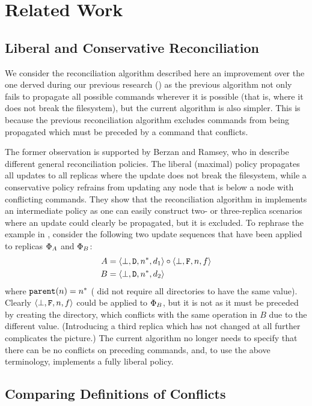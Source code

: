 
\section{Related Work}

\subsection{Liberal and Conservative Reconciliation}

We consider the reconciliation algorithm described here an improvement over
the one derved during our previous research (\cite{NREC})
as the previous algorithm not only fails to propagate all possible commands
wherever it is possible (that is, where it does not break the filesystem),
but the current algorithm is also simpler.
This is because the previous reconciliation algorithm excludes
commands from being propagated which must be preceded by a command that conflicts.

The former observation is supported by Berzan and Ramsey, who in \cite{CBNR} 
describe different general reconciliation policies.
The liberal (maximal) policy propagates all updates to all replicas where
the update does not break the filesystem, while a conservative policy
refrains from updating any node that is below a node with conflicting commands.
They show that the reconciliation algorithm in \cite{NREC} implements
an intermediate policy as one can easily construct two- or three-replica scenarios
where an update could clearly be propagated, but it is excluded.
To rephrase the example in \cite{CBNR}, consider the following two
update sequences that have been applied to replicas $\Phi_A$ and $\Phi_B$:
\begin{align*}
A&=\langle{\bot,\mathtt{D},n^*,d_1}\rangle\circ\langle{\bot,\mathtt{F},n,f}\rangle \\
B&=\langle{\bot,\mathtt{D},n^*,d_2}\rangle
\end{align*}
where $\mathtt{parent}(n)=n^*$ (\cite{NREC} did not require all directories to have the same value).
Clearly $\langle{\bot,\mathtt{F},n,f}\rangle$ could be applied to $\Phi_B$, but it is not as
it must be preceded by creating the directory, which conflicts with the same operation in $B$
due to the different value.
(Introducing a third replica which has not changed at all further complicates the picture.)
The current algorithm no longer needs to specify that there can be no conflicts
on preceding commands, and, to use the above terminology, implements a fully liberal policy.


\subsection{Comparing Definitions of Conflicts}

